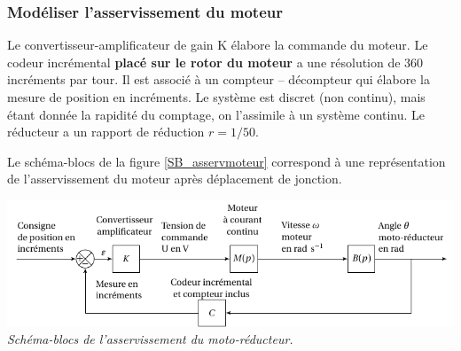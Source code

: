\documentclass[10pt,fleqn]{article} %
\begin{document}
%
%
%	
%
\subsubsection*{Modéliser l'asservissement du moteur\\}

Le convertisseur-amplificateur de gain K élabore la commande du moteur. Le codeur incrémental \textbf{placé sur le rotor du moteur} a une résolution de 360 incréments par tour. Il est associé à un compteur -- décompteur qui élabore la mesure de position en incréments. Le système est discret (non continu), mais étant donnée la rapidité du comptage, on l’assimile à un système continu. Le réducteur a un rapport de réduction $r=1/50$.

Le schéma-blocs de la figure \ref{SB_asservmoteur} correspond à une représentation de l'asservissement du moteur après déplacement de jonction.

\begin{center}%
\includegraphics[width=\linewidth]{images2/schema_bloc_moteur_2}
\textit{Schéma-blocs de l'asservissement du moto-réducteur.}
\label{SB_asservmoteur}
%

\end{center}
\end{document}
